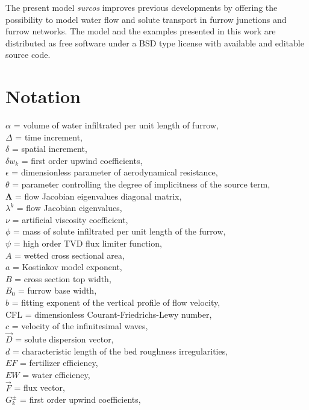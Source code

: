 \documentclass[review,authoryear]{elsarticle}
\begin{document}
The present model \emph{surcos} improves previous developments by offering the
possibility to model water flow and solute transport in furrow junctions and
furrow networks. The model and the examples presented in this work are
distributed \citep{Surcos,SurcosGit} as free software under a BSD type license
with available and editable source code.

\section*{Notation}
\noindent
$\alpha$ = volume of water infiltrated per unit length of furrow,\\
$\Delta$ = time increment,\\
$\delta$ = spatial increment,\\
$\delta w_k$ = first order upwind coefficients,\\
$\epsilon$ = dimensionless parameter of aerodynamical resistance,\\
$\theta$ = parameter controlling the degree of implicitness of
the source term,\\
$\mathbf{\Lambda}$ = flow Jacobian eigenvalues diagonal matrix,\\
$\lambda^k$ = flow Jacobian eigenvalues,\\
$\nu$ = artificial viscosity coefficient,\\
$\phi$ = mass of solute infiltrated per unit length of the furrow,\\
$\psi$ = high order TVD flux limiter function,\\
$A$ = wetted cross sectional area,\\
$a$ = Kostiakov model exponent,\\
$B$ = cross section top width,\\
$B_0$ = furrow base width,\\
$b$ = fitting exponent of the vertical profile of flow velocity,\\
CFL = dimensionless Courant-Friedrichs-Lewy number,\\
$c$ = velocity of the infinitesimal waves,\\
$\vec{D}$ = solute dispersion vector,\\
$d$ = characteristic length of the bed roughness irregularities,\\
$EF$ = fertilizer efficiency,\\
$EW$ = water efficiency,\\
$\vec{F}$ = flux vector,\\
$G_k^\pm$ = first order upwind coefficients,\\
\end{document}
